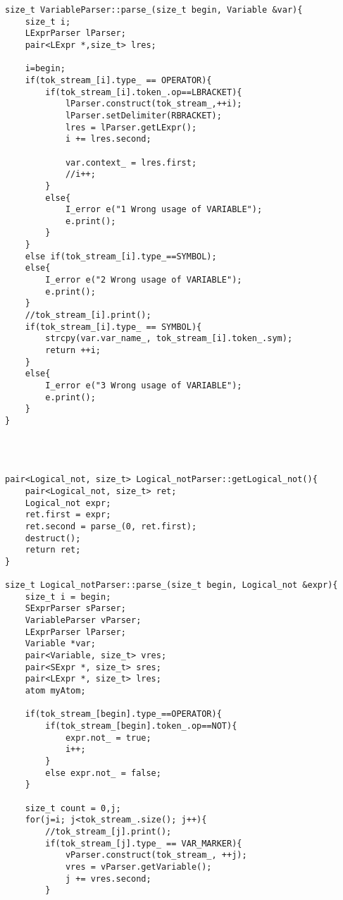 \documentclass[pdftex,12pt,letterpaper,notitlepage,twoside]{article}
\begin{document}
\begin{lstlisting}[frame=single,caption={C program for testing}]
size_t VariableParser::parse_(size_t begin, Variable &var){
    size_t i;
    LExprParser lParser;
    pair<LExpr *,size_t> lres;

    i=begin;
    if(tok_stream_[i].type_ == OPERATOR){
        if(tok_stream_[i].token_.op==LBRACKET){
            lParser.construct(tok_stream_,++i);
            lParser.setDelimiter(RBRACKET);
            lres = lParser.getLExpr();
            i += lres.second;

            var.context_ = lres.first;
            //i++;
        }
        else{
            I_error e("1 Wrong usage of VARIABLE");
            e.print();
        }
    }
    else if(tok_stream_[i].type_==SYMBOL);
    else{
        I_error e("2 Wrong usage of VARIABLE");
        e.print();
    }
    //tok_stream_[i].print();
    if(tok_stream_[i].type_ == SYMBOL){
        strcpy(var.var_name_, tok_stream_[i].token_.sym);
        return ++i;
    }
    else{
        I_error e("3 Wrong usage of VARIABLE");
        e.print();
    }
}




pair<Logical_not, size_t> Logical_notParser::getLogical_not(){
    pair<Logical_not, size_t> ret;
    Logical_not expr;
    ret.first = expr;
    ret.second = parse_(0, ret.first);
    destruct();
    return ret;
}

size_t Logical_notParser::parse_(size_t begin, Logical_not &expr){
    size_t i = begin;
    SExprParser sParser;
    VariableParser vParser;
    LExprParser lParser;
    Variable *var;
    pair<Variable, size_t> vres;
    pair<SExpr *, size_t> sres;
    pair<LExpr *, size_t> lres;
    atom myAtom;

    if(tok_stream_[begin].type_==OPERATOR){
        if(tok_stream_[begin].token_.op==NOT){
            expr.not_ = true;
            i++;
        }
        else expr.not_ = false;
    }

    size_t count = 0,j;
    for(j=i; j<tok_stream_.size(); j++){
        //tok_stream_[j].print();
        if(tok_stream_[j].type_ == VAR_MARKER){
            vParser.construct(tok_stream_, ++j);
            vres = vParser.getVariable();
            j += vres.second;
        }


\end{lstlisting}
\end{document}

